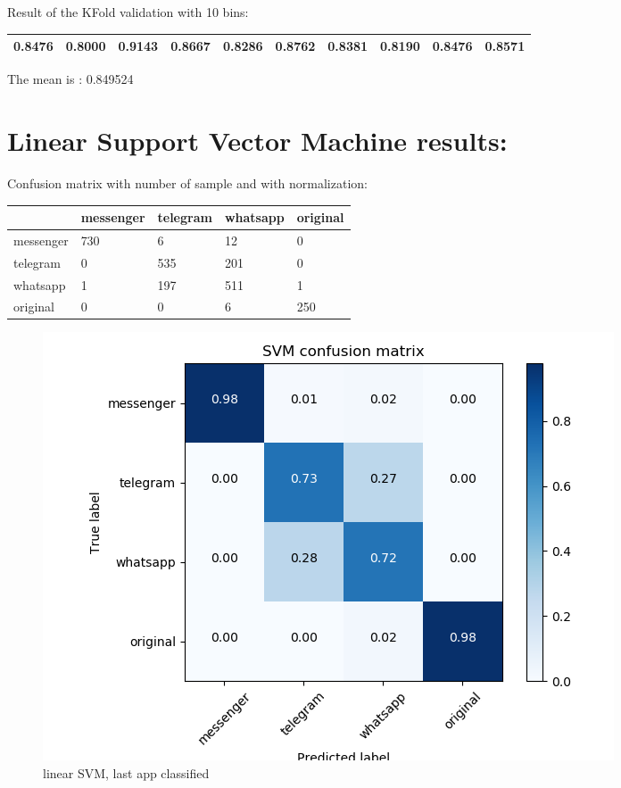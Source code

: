 Result of the KFold validation with 10 bins:
 {\def\arraystretch{1.3} 
 \begin{table}[H] 
\centering 
\begin{tabular}{|l |l |l |l |l |l |l |l |l |l |}  
\hline 
0.8476&
0.8000&
0.9143&
0.8667&
0.8286&
0.8762&
0.8381&
0.8190&
0.8476&
0.8571\\ \hline  

\end{tabular} 
\end{table} }

The mean is : 0.849524\section{Linear Support Vector Machine results:} 
Confusion matrix with number of sample and with normalization:
 {\def\arraystretch{1.3} 
 \begin{table}[H] 
\centering 
\begin{tabular}{|l|l|l|l|l|} 
\hline 
  &messenger  &telegram  &whatsapp  &original  \\ \hline
messenger  &730  &6  &12  &0  \\ \hline
telegram  &0  &535  &201  &0  \\ \hline
whatsapp  &1  &197  &511  &1  \\ \hline
original  &0  &0  &6  &250  \\ \hline
\end{tabular} 
\end{table} }

 \begin{figure}[H] 
\centering 
\includegraphics[scale=.6]{images/new_met_lsvm_initial_double_simple.png} 
\caption{linear SVM, last app classified} 
\end{figure} 


